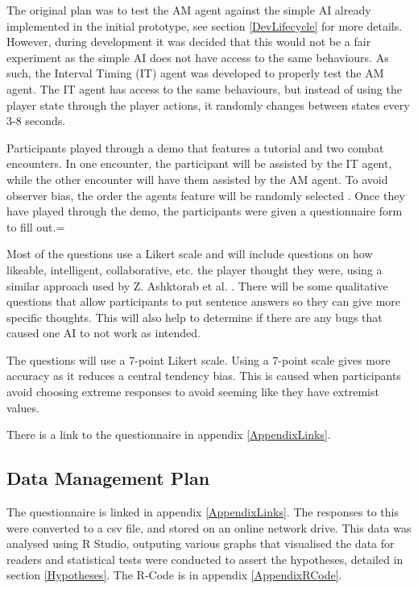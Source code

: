 \documentclass{IEEEtran}
\begin{document}
The original plan was to test the AM agent against the simple AI already implemented in the initial prototype, see section \ref{DevLifecycle} for more details. However, during development it was decided that this would not be a fair experiment as the simple AI does not have access to the same behaviours. As such, the Interval Timing (IT) agent was developed to properly test the AM agent. The IT agent has access to the same behaviours, but instead of using the player state through the player actions, it randomly changes between states every 3-8 seconds.

Participants played through a demo that features a tutorial and two combat encounters. In one encounter, the participant will be assisted by the IT agent, while the other encounter will have them assisted by the AM agent. To avoid observer bias, the order the agents feature will be randomly selected \cite{hrobjartsson2013observer}. Once they have played through the demo, the participants were given a questionnaire form to fill out.=

Most of the questions use a Likert scale and will include questions on how likeable, intelligent, collaborative, etc. the player thought they were, using a similar approach used by Z. Ashktorab et al. \cite{SocialPerceptions2020}. There will be some qualitative questions that allow participants to put sentence answers so they can give more specific thoughts. This will also help to determine if there are any bugs that caused one AI to not work as intended.


The questions will use a 7-point Likert scale. Using a 7-point scale gives more accuracy as it reduces a central tendency bias. This is caused when participants avoid choosing extreme responses to avoid seeming like they have extremist values.

There is a link to the questionnaire in appendix \ref{AppendixLinks}.

\subsection{Data Management Plan}
\label{DataManagement}


The questionnaire is linked in appendix \ref{AppendixLinks}. The responses to this were converted to a csv file, and stored on an online network drive. This data was analysed using R Studio, outputing various graphs that visualised the data for readers and statistical tests were conducted to assert the hypotheses, detailed in section \ref{Hypotheses}. The R-Code is in appendix \ref{AppendixRCode}.
\end{document}
